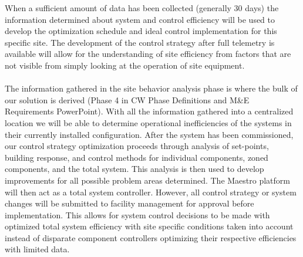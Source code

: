 When a sufficient amount of data has been collected (generally 30 days) the information determined about system and control efficiency will be used to develop the optimization schedule and ideal control implementation for this specific site. The development of the control strategy after full telemetry is available will allow for the understanding of site efficiency from factors that are not visible from simply looking at the operation of site equipment.
\\
\\
The information gathered in the site behavior analysis phase is where the bulk of our solution is derived (Phase 4 in CW Phase Definitions and M\&E Requirements PowerPoint). With all the information gathered into a centralized location we will be able to determine operational inefficiencies of the systems in their currently installed configuration. After the system has been commissioned, our control strategy optimization proceeds through analysis of set-points, building response, and control methods for individual components, zoned components, and the total system. This analysis is then used to develop improvements for all possible problem areas determined. The Maestro platform will then act as a total system controller. However, all control strategy or system changes will be submitted to facility management for approval before implementation. This allows for system control decisions to be made with optimized total system efficiency with site specific conditions taken into account instead of disparate component controllers optimizing their respective efficiencies with limited data.